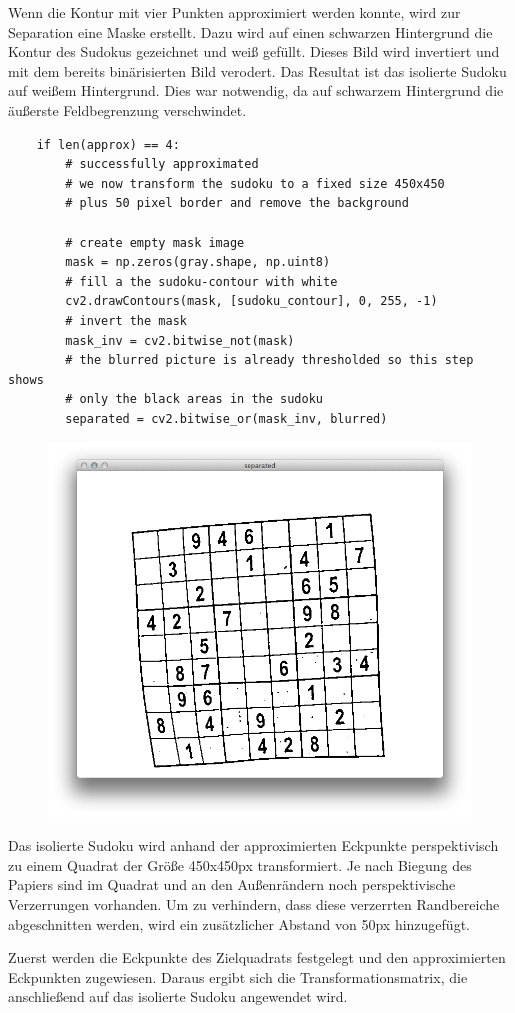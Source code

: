 Wenn die Kontur mit vier Punkten approximiert werden konnte, wird zur Separation eine Maske erstellt.
Dazu wird auf einen schwarzen Hintergrund die Kontur des Sudokus gezeichnet und weiß gefüllt.
Dieses Bild wird invertiert und mit dem bereits binärisierten Bild verodert.
Das Resultat ist das isolierte Sudoku auf weißem Hintergrund.
Dies war notwendig, da auf schwarzem Hintergrund die äußerste Feldbegrenzung verschwindet.

\begin{lstlisting}
    if len(approx) == 4:
        # successfully approximated
        # we now transform the sudoku to a fixed size 450x450
        # plus 50 pixel border and remove the background

        # create empty mask image
        mask = np.zeros(gray.shape, np.uint8)
        # fill a the sudoku-contour with white
        cv2.drawContours(mask, [sudoku_contour], 0, 255, -1)
        # invert the mask
        mask_inv = cv2.bitwise_not(mask)
        # the blurred picture is already thresholded so this step shows
        # only the black areas in the sudoku
        separated = cv2.bitwise_or(mask_inv, blurred)
\end{lstlisting}

\begin{figure}[H]
    \begin{center}
        \includegraphics[width=.5\textwidth]{Abbildungen/separated}
    \end{center}
\end{figure}

Das isolierte Sudoku wird anhand der approximierten Eckpunkte perspektivisch zu einem Quadrat der Größe 450x450px transformiert.
Je nach Biegung des Papiers sind im Quadrat und an den Außenrändern noch perspektivische Verzerrungen vorhanden. Um zu verhindern, dass diese verzerrten Randbereiche abgeschnitten werden, wird ein zusätzlicher Abstand von 50px hinzugefügt.

Zuerst werden die Eckpunkte des Zielquadrats festgelegt und den approximierten Eckpunkten zugewiesen. Daraus ergibt sich die Transformationsmatrix, die anschließend auf das isolierte Sudoku angewendet wird.

